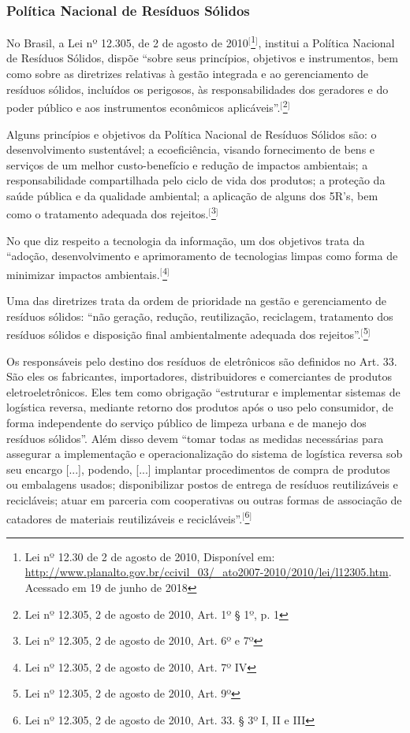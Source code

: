 \subsubsection{Política Nacional de Resíduos Sólidos}

No Brasil, a Lei nº 12.305, de 2 de agosto de 2010$^{[}$\footnote{Lei nº 12.30 de 2 de agosto de 2010, Disponível em: \url{http://www.planalto.gov.br/ccivil_03/_ato2007-2010/2010/lei/l12305.htm}. Acessado em 19 de junho de 2018}$^{]}$, institui a Política Nacional de Resíduos Sólidos, dispõe ``sobre seus princípios, objetivos e instrumentos, bem como sobre as diretrizes relativas à gestão integrada e ao gerenciamento de resíduos sólidos, incluídos os perigosos, às responsabilidades dos geradores e do poder público e aos instrumentos econômicos aplicáveis''.$^{[}$\footnote{Lei nº 12.305, 2 de agosto de 2010, Art. 1º  § 1º, p. 1}$^{]}$

Alguns princípios e objetivos da Política Nacional de Resíduos Sólidos são: o desenvolvimento sustentável; a ecoeficiência, visando fornecimento de bens e serviços de um melhor custo-benefício e redução de impactos ambientais; a responsabilidade compartilhada pelo ciclo de vida dos produtos; a proteção da saúde pública e da qualidade ambiental; a aplicação de alguns dos 5R’s, bem como o tratamento adequada dos rejeitos.$^{[}$\footnote{Lei nº 12.305, 2 de agosto de 2010, Art. 6º e 7º}$^{]}$

No que diz respeito a tecnologia da informação, um dos objetivos trata da “adoção, desenvolvimento e aprimoramento de tecnologias limpas como forma de minimizar impactos ambientais.$^{[}$\footnote{Lei nº 12.305, 2 de agosto de 2010, Art. 7º IV}$^{]}$

Uma das diretrizes trata da ordem de prioridade na gestão e gerenciamento de resíduos sólidos: “não geração, redução, reutilização, reciclagem, tratamento dos resíduos sólidos e disposição final ambientalmente adequada dos rejeitos”.$^{[}$\footnote{Lei nº 12.305, 2 de agosto de 2010, Art. 9º}$^{]}$

Os responsáveis pelo destino dos resíduos de eletrônicos são definidos no Art. 33. São eles os fabricantes, importadores, distribuidores e comerciantes de produtos eletroeletrônicos. Eles tem como obrigação “estruturar e implementar sistemas de logística reversa, mediante retorno dos produtos após o uso pelo consumidor, de forma independente do serviço público de limpeza urbana e de manejo dos resíduos sólidos”. Além disso devem “tomar todas as medidas necessárias para assegurar a implementação e operacionalização do sistema de logística reversa sob seu encargo [...], podendo, [...] implantar procedimentos de compra de produtos ou embalagens usados; disponibilizar postos de entrega de resíduos reutilizáveis e recicláveis; atuar em parceria com cooperativas ou outras formas de associação de catadores de materiais reutilizáveis e recicláveis”.$^{[}$\footnote{Lei nº 12.305, 2 de agosto de 2010, Art. 33. § 3º I, II e III}$^{]}$

